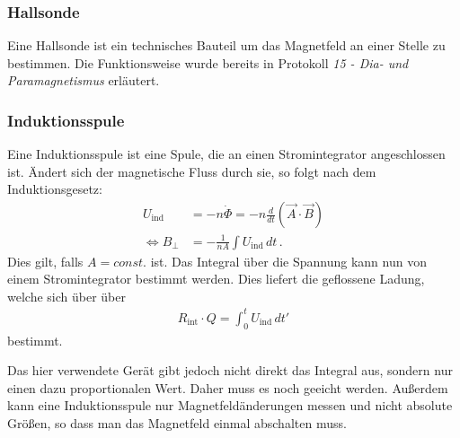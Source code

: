 \documentclass[12pt,a4paper,titlepage,headinclude,bibtotoc]{scrartcl}
\begin{document}
\subsubsection*{Hallsonde}
Eine Hallsonde ist ein technisches Bauteil um das Magnetfeld an einer Stelle zu bestimmen.
Die Funktionsweise wurde bereits in Protokoll \emph{15 - Dia- und Paramagnetismus} erläutert.

\subsubsection*{Induktionsspule}
Eine Induktionsspule ist eine Spule, die an einen Stromintegrator angeschlossen ist.
Ändert sich der magnetische Fluss durch sie, so folgt nach dem Induktionsgesetz:
\begin{align}
	U_\text{ind}&=-n\dot\Phi=-n\frac d{dt}(\vec A\cdot\vec B)\\
	\Leftrightarrow B_\perp &=-\frac{1}{nA}\int U_\text{ind}\, dt\,.
\end{align}
Dies gilt, falls $A=const.$ ist.
Das Integral über die Spannung kann nun von einem Stromintegrator bestimmt werden.
Dies liefert die geflossene Ladung, welche sich über über 
\begin{align}
	R_\text{int}\cdot Q=\int_0^t U_\text{ind}\, dt'
\end{align}
bestimmt.

Das hier verwendete Gerät gibt jedoch nicht direkt das Integral aus, sondern nur einen dazu proportionalen Wert.
Daher muss es noch geeicht werden.
Außerdem kann eine Induktionsspule nur Magnetfeldänderungen messen und nicht absolute Größen, so dass man das Magnetfeld einmal abschalten muss.
\end{document}
